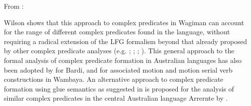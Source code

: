 \documentclass[output=paper,hidelinks]{langscibook}
\begin{document}
\ea
\label{fused-lcs}
From \citet[147: example (39)]{Wilson1999}:\\
\z

Wilson shows that this approach to complex predicates in Wagiman can account for the range of different complex predicates found in the language, without requiring a radical extension of the LFG formalism beyond that already proposed by other complex predicate analyses (e.g. \citealt{Alsina:PhD,alsina1996the-role}; \citealt{Butt1995,Butt1997}; \citealt{MohananT1994,MohananT1997}; \citealt{AndrewsManning1999}). This general approach to the formal analysis of complex predicate formation in Australian languages has also been adopted by \citet{Bowern2004} for Bardi, and \citet{Nordlinger2010} for associated motion and motion serial verb constructions in Wambaya.  An alternative approach to complex predicate formation using glue semantics as suggested in \citet{AndrewsManning1999} is proposed for the analysis of similar complex predicates in the central Australian language Arrernte by \citet{Drasetal2012}.
\end{document}
